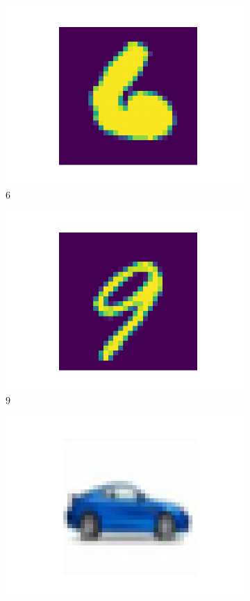 \documentclass[letterpaper]{article} %
\begin{document}
\begin{figure}[htbp]
\begin{subfigure}{0.115\textwidth}
  \includegraphics[width=\linewidth]{mnist_6.png}
  \caption{6}
\end{subfigure}\hfil
\begin{subfigure}{0.115\textwidth}
  \includegraphics[width=\linewidth]{mnist_9.png}
  \caption{9}
\end{subfigure}
\begin{subfigure}{0.115\textwidth}
  \includegraphics[width=\linewidth]{cifar-10_1.png}

\end{subfigure}
\end{figure}
\end{document}
